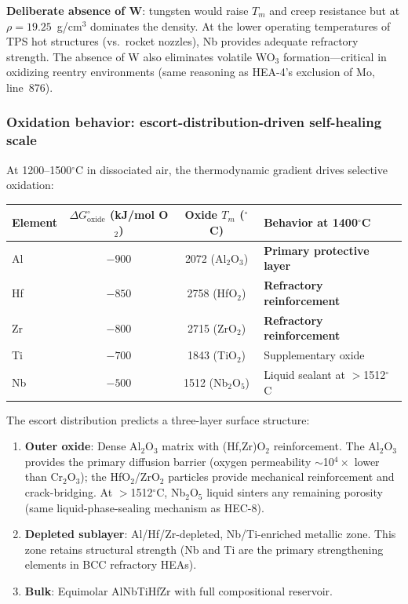 \documentclass[12pt,letterpaper]{article}
\theoremstyle{definition}
\begin{document}
\textbf{Deliberate absence of W}: tungsten would raise $T_m$ and creep resistance but at $\rho = 19.25$~g/cm$^3$ dominates the density.  At the lower operating temperatures of TPS hot structures (vs.\ rocket nozzles), Nb provides adequate refractory strength.  The absence of W also eliminates volatile WO$_3$ formation---critical in oxidizing reentry environments (same reasoning as HEA-4's exclusion of Mo, line~876).

\subsubsection{Oxidation behavior: escort-distribution-driven self-healing scale}

At 1200--1500$^\circ$C in dissociated air, the thermodynamic gradient drives selective oxidation:

\begin{center}
\begin{tabular}{@{}lccl@{}}
\toprule
Element & $\Delta G^\circ_{\mathrm{oxide}}$ (kJ/mol O$_2$) & Oxide $T_m$ ($^\circ$C) & Behavior at 1400$^\circ$C \\
\midrule
Al & $-900$ & 2072 (Al$_2$O$_3$) & \textbf{Primary protective layer} \\
Hf & $-850$ & 2758 (HfO$_2$) & \textbf{Refractory reinforcement} \\
Zr & $-800$ & 2715 (ZrO$_2$) & \textbf{Refractory reinforcement} \\
Ti & $-700$ & 1843 (TiO$_2$) & Supplementary oxide \\
Nb & $-500$ & 1512 (Nb$_2$O$_5$) & Liquid sealant at $>$1512$^\circ$C \\
\bottomrule
\end{tabular}
\end{center}

The escort distribution predicts a three-layer surface structure:

\begin{enumerate}
  \item \textbf{Outer oxide}: Dense Al$_2$O$_3$ matrix with (Hf,Zr)O$_2$ reinforcement.  The Al$_2$O$_3$ provides the primary diffusion barrier (oxygen permeability $\sim$10$^4\times$ lower than Cr$_2$O$_3$); the HfO$_2$/ZrO$_2$ particles provide mechanical reinforcement and crack-bridging.  At $>$1512$^\circ$C, Nb$_2$O$_5$ liquid sinters any remaining porosity (same liquid-phase-sealing mechanism as HEC-8).
  \item \textbf{Depleted sublayer}: Al/Hf/Zr-depleted, Nb/Ti-enriched metallic zone.  This zone retains structural strength (Nb and Ti are the primary strengthening elements in BCC refractory HEAs).
  \item \textbf{Bulk}: Equimolar AlNbTiHfZr with full compositional reservoir.
\end{enumerate}
\end{document}
